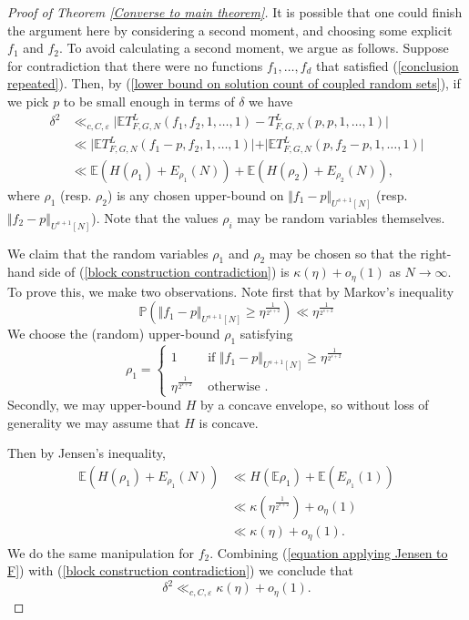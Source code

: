 \documentclass[12pt,a4paper,twoside,reqno]{amsart}
\numberwithin{equation}{section}
\begin{document}
\begin{proof}[Proof of Theorem \ref{Converse to main theorem}]
It is possible that one could finish the argument here by considering a second moment, and choosing some explicit $f_1$ and $f_2$. To avoid calculating a second moment, we argue as follows. Suppose for contradiction that there were no functions $f_1,\dots,f_d$ that satisfied (\ref{conclusion repeated}). Then, by (\ref{lower bound on solution count of coupled random sets}), if we pick $p$ to be small enough in terms of $\delta$ we have
\begin{align}
\label{block construction contradiction}
\delta^2 &\ll_{c,C,\varepsilon} \vert \mathbb{E}T_{F,G,N}^L(f_1,f_2,1,\dots,1) - T_{F,G,N}^L(p,p,1,\dots,1)\vert \nonumber\\
&\ll \vert \mathbb{E}T_{F,G,N}^L(f_1-p,f_2,1,\dots,1)\vert + \vert \mathbb{E}T_{F,G,N}^L(p,f_2-p,1,\dots,1)\vert \nonumber\\
&\ll \mathbb{E}(H(\rho_1) + E_{\rho_1}(N)) +\mathbb{E}(H(\rho_2) + E_{\rho_2}(N)),
\end{align}
\noindent where $\rho_1$ (resp. $\rho_2$) is any chosen upper-bound on $\Vert f_1 - p\Vert_{U^{s+1}[N]}$ (resp. $\Vert f_2 - p\Vert_{U^{s+1}[N]}$). Note that the values $\rho_i$ may be random variables themselves. 

We claim that the random variables $\rho_1$ and $\rho_2$ may be chosen so that the right-hand side of (\ref{block construction contradiction}) is $\kappa(\eta)+o_{\eta}(1)$ as $N\rightarrow \infty$. To prove this, we make two observations. Note first that by Markov's inequality $$ \mathbb{P}(\Vert f_1 - p\Vert_{U^{s+1}[N]}\geqslant \eta^{\frac{1}{2^{s+2}}}) \ll \eta^{\frac{1}{2^{s+2}}}$$ We choose the (random) upper-bound $\rho_1$ satisfying $$\rho_1 =\begin{cases}
1 & \text{ if } \Vert f_1 - p\Vert_{U^{s+1}[N]}\geqslant \eta^{\frac{1}{2^{s+2}}} \\
\eta^{\frac{1}{2^{s+2}}}  & \text{ otherwise }.
\end{cases}$$ Secondly, we may upper-bound $H$ by a concave envelope, so without loss of generality we may assume that $H$ is concave. 

Then by Jensen's inequality, 
\begin{align}
\label{equation applying Jensen to F}
\mathbb{E}(H(\rho_1) + E_{\rho_1}(N)) &\ll H(\mathbb{E}\rho_1) + \mathbb{E}(E_{\rho_1}(1))\nonumber\\
&\ll \kappa(\eta^{\frac{1}{2^{s+2}}} )  + o_{\eta}(1)\nonumber\\
&\ll \kappa(\eta)+o_{\eta}(1).
\end{align} 
\noindent We do the same manipulation for $f_2$. Combining (\ref{equation applying Jensen to F}) with (\ref{block construction contradiction}) we conclude that 
\begin{equation}
\label{equation final final final contradiction}
\delta^2 \ll_{c,C,\varepsilon} \kappa(\eta) + o_{\eta}(1). 
\end{equation}


\end{proof}
\end{document}
